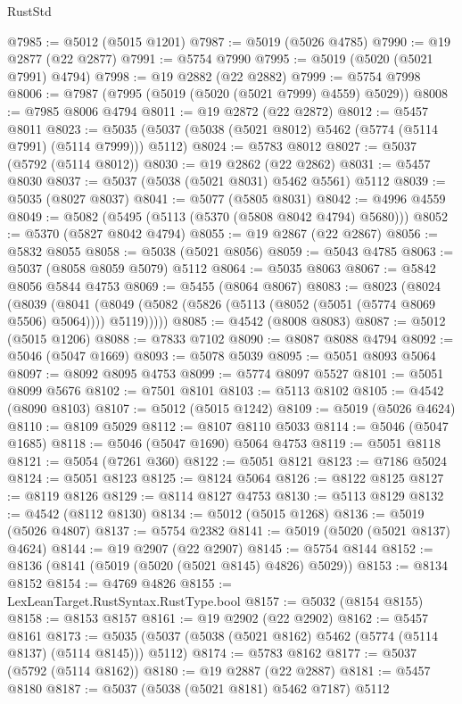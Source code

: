 \begin{lexlean}{RustStd}
\begin{coremodule}
@7985 := @5012 (@5015 @1201)
@7987 := @5019 (@5026 @4785)
@7990 := @19 @2877 (@22 @2877)
@7991 := @5754 @7990
@7995 := @5019 (@5020 (@5021 @7991) @4794)
@7998 := @19 @2882 (@22 @2882)
@7999 := @5754 @7998
@8006 := @7987 (@7995 (@5019 (@5020 (@5021 @7999) @4559) @5029))
@8008 := @7985 @8006 @4794
@8011 := @19 @2872 (@22 @2872)
@8012 := @5457 @8011
@8023 := @5035 (@5037 (@5038 (@5021 @8012) @5462 (@5774 (@5114 @7991) (@5114 @7999))) @5112)
@8024 := @5783 @8012
@8027 := @5037 (@5792 (@5114 @8012))
@8030 := @19 @2862 (@22 @2862)
@8031 := @5457 @8030
@8037 := @5037 (@5038 (@5021 @8031) @5462 @5561) @5112
@8039 := @5035 (@8027 @8037)
@8041 := @5077 (@5805 @8031)
@8042 := @4996 @4559
@8049 := @5082 (@5495 (@5113 (@5370 (@5808 @8042 @4794) @5680)))
@8052 := @5370 (@5827 @8042 @4794)
@8055 := @19 @2867 (@22 @2867)
@8056 := @5832 @8055
@8058 := @5038 (@5021 @8056)
@8059 := @5043 @4785
@8063 := @5037 (@8058 @8059 @5079) @5112
@8064 := @5035 @8063
@8067 := @5842 @8056 @5844 @4753
@8069 := @5455 (@8064 @8067)
@8083 := @8023
    (@8024
      (@8039
        (@8041 (@8049 (@5082 (@5826 (@5113 (@8052 (@5051 (@5774 @8069 @5506) @5064)))) @5119)))))
@8085 := @4542 (@8008 @8083)
@8087 := @5012 (@5015 @1206)
@8088 := @7833 @7102
@8090 := @8087 @8088 @4794
@8092 := @5046 (@5047 @1669)
@8093 := @5078 @5039
@8095 := @5051 @8093 @5064
@8097 := @8092 @8095 @4753
@8099 := @5774 @8097 @5527
@8101 := @5051 @8099 @5676
@8102 := @7501 @8101
@8103 := @5113 @8102
@8105 := @4542 (@8090 @8103)
@8107 := @5012 (@5015 @1242)
@8109 := @5019 (@5026 @4624)
@8110 := @8109 @5029
@8112 := @8107 @8110 @5033
@8114 := @5046 (@5047 @1685)
@8118 := @5046 (@5047 @1690) @5064 @4753
@8119 := @5051 @8118
@8121 := @5054 (@7261 @360)
@8122 := @5051 @8121
@8123 := @7186 @5024
@8124 := @5051 @8123
@8125 := @8124 @5064
@8126 := @8122 @8125
@8127 := @8119 @8126
@8129 := @8114 @8127 @4753
@8130 := @5113 @8129
@8132 := @4542 (@8112 @8130)
@8134 := @5012 (@5015 @1268)
@8136 := @5019 (@5026 @4807)
@8137 := @5754 @2382
@8141 := @5019 (@5020 (@5021 @8137) @4624)
@8144 := @19 @2907 (@22 @2907)
@8145 := @5754 @8144
@8152 := @8136 (@8141 (@5019 (@5020 (@5021 @8145) @4826) @5029))
@8153 := @8134 @8152
@8154 := @4769 @4826
@8155 := LexLeanTarget.RustSyntax.RustType.bool
@8157 := @5032 (@8154 @8155)
@8158 := @8153 @8157
@8161 := @19 @2902 (@22 @2902)
@8162 := @5457 @8161
@8173 := @5035 (@5037 (@5038 (@5021 @8162) @5462 (@5774 (@5114 @8137) (@5114 @8145))) @5112)
@8174 := @5783 @8162
@8177 := @5037 (@5792 (@5114 @8162))
@8180 := @19 @2887 (@22 @2887)
@8181 := @5457 @8180
@8187 := @5037 (@5038 (@5021 @8181) @5462 @7187) @5112

\end{coremodule}
\end{lexlean}
